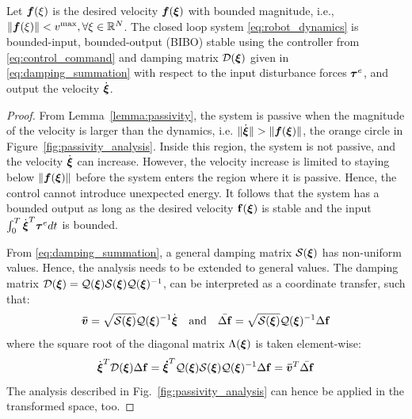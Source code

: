 \begin{theorem}  \label{theorem:passivity}
  Let $\boldsymbol{f}(\xi)$ is the desired velocity $\boldsymbol{f}(\boldsymbol{\xi})$ with bounded magnitude, i.e., $\| \boldsymbol{f}(\xi) \| < v^{\mathrm{max}}, \forall \xi \in \mathbb{R}^N$.
   The closed loop system \eqref{eq:robot_dynamics} is bounded-input, bounded-output (BIBO) stable using the controller from \eqref{eq:control_command} and damping matrix $\mathcal{D}(\boldsymbol{\xi})$ given in \eqref{eq:damping_summation} with respect to the input disturbance forces $\boldsymbol{\tau}^e$, and output the velocity $\dot{\boldsymbol{\xi}}$.
\end{theorem}
 
\begin{proof}
From Lemma~\ref{lemma:passivity}, the system is passive when the magnitude of the velocity is larger than the dynamics, i.e. $\| \dot{\boldsymbol{\xi}} \| > \|\boldsymbol{f}(\boldsymbol{\xi}) \|$, the orange circle in Figure~\ref{fig:passivity_analysis}.
Inside this region, the system is not passive, and the velocity $\dot {\boldsymbol{\xi}}$ can increase. However, the velocity increase is limited to staying below $\| \boldsymbol{f}({\boldsymbol{\xi}}) \|$ before the system enters the region where it is passive. Hence, the control cannot introduce unexpected energy.
It follows that the system has a bounded output as long as the desired velocity $\mathbf{f}({\boldsymbol{\xi}})$ is stable and the input $\int_{0}^T \dot{{\boldsymbol{\xi}}}^T \boldsymbol{\tau}^e dt$ is bounded. 

From \eqref{eq:damping_summation}, a general damping matrix $\mathcal{S}(\boldsymbol{\xi})$ has non-uniform values. Hence, the analysis needs to be extended to general values.
The damping matrix $\mathcal{D}({\boldsymbol{\xi}}) = \mathcal{Q}({\boldsymbol{\xi}}) \mathcal{S}({\boldsymbol{\xi}}) \mathcal{Q}({\boldsymbol{\xi}})^{-1}$, can be interpreted as a coordinate transfer, such that:
\begin{equation}
	\boldsymbol{\bar v} = \sqrt{\mathcal{S}({\boldsymbol{\xi}})} \mathcal{Q}({\boldsymbol{\xi}})^{-1} \dot{{\boldsymbol{\xi}}}
	\quad \text{and} \quad
	\bar{\Delta \mathbf f} = \sqrt{\mathcal{S}({\boldsymbol{\xi}})} \mathcal{Q}({\boldsymbol{\xi}})^{-1} \Delta \mathbf{f}
\end{equation}
where the square root of the diagonal matrix $\Lambda({\boldsymbol{\xi}})$ is taken element-wise:
\begin{equation}
\dot{\boldsymbol{\xi}}^T \mathcal{D}({\boldsymbol{\xi}}) \Delta \mathbf{f} = \boldsymbol{\dot \xi}^T \mathcal{Q}({\boldsymbol{\xi}}) \mathcal{S}({\boldsymbol{\xi}}) \mathcal{Q}({\boldsymbol{\xi}})^{-1} \Delta \mathbf{f} = \boldsymbol{\bar v}^T \bar{\Delta \mathbf f}
\end{equation}
The analysis described in Fig.~\ref{fig:passivity_analysis} can hence be applied in the transformed space, too. 


\end{proof}
